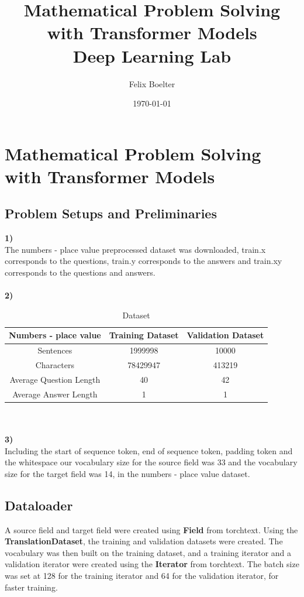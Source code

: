 \documentclass{article}
\title{\textbf{Mathematical Problem Solving with Transformer Models}\\ Deep Learning Lab}
\author{Felix Boelter }
\date{\today}
\begin{document}
\maketitle
\clearpage
\section{Mathematical Problem Solving with Transformer Models}
\subsection{Problem Setups and Preliminaries}
\textbf{1)} \\The numbers - place value preprocessed dataset was downloaded, train.x corresponds to the questions,
train.y corresponds to the answers and train.xy corresponds to the questions and answers.\\\\
\textbf{2)}\\
\begin{table}[ht]
\caption{Dataset}
\begin{center}
\begin{tabular}{ccc} \toprule
   \textbf{Numbers - place value}& \textbf{Training Dataset} & \textbf{Validation Dataset} \\ \midrule
    
    Sentences  & 1999998 & 10000\\
    Characters  & 78429947 & 413219 \\
    Average Question Length  & 40 & 42  \\
    Average Answer Length & 1 & 1  \\\bottomrule
\end{tabular}
\end{center}
\end{table}
\\\\
\textbf{3)}\\
Including the start of sequence token, end of sequence token, padding token and the whitespace our vocabulary size for the source field was 33 and the vocabulary size for the target field was 14, in the numbers - place value dataset.

\subsection{Dataloader}
A source field and target field were created using  \textbf{Field} from torchtext. Using the \textbf{TranslationDataset}, the training and validation datasets were created. The vocabulary was then built on the training dataset, and a training iterator and a validation iterator were created using the \textbf{Iterator} from torchtext. The batch size was set at 128 for the training iterator and 64 for the validation iterator, for faster training.
\clearpage
\end{document}
